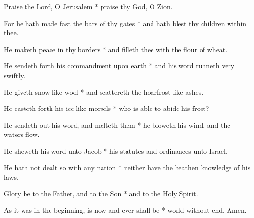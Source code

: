 Praise the Lord, O Jerusalem * praise thy God, O Zion.

For he hath made fast the bars of thy gates * and hath blest thy children within thee.
	
He maketh peace in thy borders * and filleth thee with the flour of wheat.
	
He sendeth forth his commandment upon earth * and his word runneth very swiftly.
	
He giveth snow like wool * and scattereth the hoarfrost like ashes.
	
He casteth forth his ice like morsels * who is able to abide his frost?
	
He sendeth out his word, and melteth them * he bloweth his wind, and the waters flow.
	
He sheweth his word unto Jacob * his statutes and ordinances unto Israel.
	
He hath not dealt so with any nation * neither have the heathen knowledge of his laws.
	
Glory be to the Father, and to the Son * and to the Holy Spirit.
	
As it was in the beginning, is now and ever shall be * world without end. Amen.